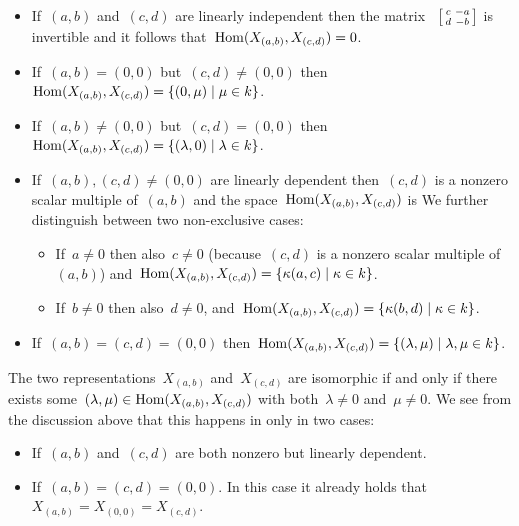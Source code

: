 \begin{itemize}
  \item
    If~$(a,b)$ and~$(c,d)$ are linearly independent then the matrix~%
    $
      \begin{bsmallmatrix}
        c & -a  \\
        d & -b
      \end{bsmallmatrix}
    $ %
    is invertible and it follows that~$\operatorname{Hom}(X_{(a,b)}, X_{(c,d)}) = 0$.
  \item
    If~$(a,b) = (0,0)$ but~$(c,d) \neq (0,0)$ then~$\Hom(X_{(a,b)}, X_{(c,d)}) = \{ (0,\mu) \suchthat \mu \in k \}$.
  \item
    If~$(a,b) \neq (0,0)$ but~$(c,d) = (0,0)$ then~$\Hom(X_{(a,b)}, X_{(c,d)}) = \{ (\lambda, 0) \suchthat \lambda \in k \}$.
  \item
    If~$(a,b), (c,d) \neq (0,0)$ are linearly dependent then~$(c,d)$ is a nonzero scalar multiple of~$(a,b)$ and the space~$\operatorname{Hom}(X_{(a,b)}, X_{(c,d)})$ is 
    We further distinguish between two non-exclusive cases:
    \begin{itemize}
      \item
        If~$a \neq 0$ then also~$c \neq 0$ (because~$(c,d)$ is a nonzero scalar multiple of~$(a,b)$) and~$\Hom(X_{(a,b)}, X_{(c,d)}) = \{ \kappa(a,c) \suchthat \kappa \in k \}$.
      \item
        If~$b \neq 0$ then also~$d \neq 0$, and~$\Hom(X_{(a,b)}, X_{(c,d)}) = \{ \kappa(b,d) \suchthat \kappa \in k \}$.
    \end{itemize}
  \item
    If~$(a,b) = (c,d) = (0,0)$ then~$\Hom(X_{(a,b)}, X_{(c,d)}) = \{ (\lambda, \mu) \suchthat \lambda, \mu \in k \}$.
\end{itemize}
The two representations~$X_{(a,b)}$ and~$X_{(c,d)}$ are isomorphic if and only if there exists some~$(\lambda, \mu) \in \operatorname{Hom}(X_{(a,b)}, X_{(c,d)})$ with both~$\lambda \neq 0$ and~$\mu \neq 0$.
We see from the discussion above that this happens in only in two cases:
\begin{itemize}
  \item
    If~$(a,b)$ and~$(c,d)$ are both nonzero but linearly dependent.
  \item
    If~$(a,b) = (c,d) = (0,0)$.
    In this case it already holds that~$X_{(a,b)} = X_{(0,0)} = X_{(c,d)}$.
\end{itemize}




